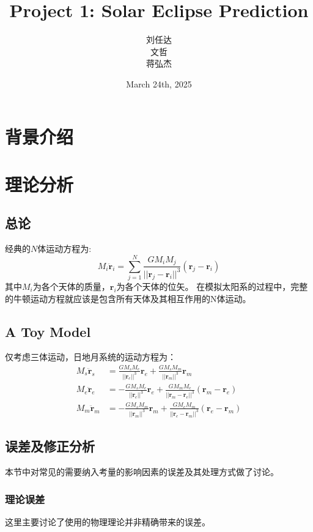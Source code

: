 \documentclass[hidelinks]{article}
\title{\textbf{Project 1: Solar Eclipse Prediction}}
\author{刘任达\\文哲\\蒋弘杰}
\date{March 24th, 2025}
\begin{document}
\hypersetup{bookmarksnumbered=true,}
\maketitle
\setcounter{tocdepth}{2}
\begin{Large}
\tableofcontents
\end{Large}%
\pagebreak

\section{背景介绍}

\section{理论分析}
\subsection{总论}
经典的$N$体运动方程为:
$$
M_i\ddot{\mathbf{r}}_i = \sum_{j=1}^N\frac{GM_iM_j}{||\mathbf{r}_j-\mathbf{r}_i||^3}(\mathbf{r}_j-\mathbf{r}_i)
$$
其中${M_i}$为各个天体的质量，$\mathbf{r}_i$为各个天体的位矢。
在模拟太阳系的过程中，完整的牛顿运动方程就应该是包含所有天体及其相互作用的N体运动。
\subsection{A Toy Model}
仅考虑三体运动，日地月系统的运动方程为：
\begin{align*}
    M_s\ddot{\mathbf{r}}_s&=\frac{GM_sM_e}{||\mathbf{r}_e||^3}\mathbf{r}_e+\frac{GM_sM_m}{||\mathbf{r}_m||^3}\mathbf{r}_m\\
    M_e\ddot{\mathbf{r}}_e&=-\frac{GM_sM_e}{||\mathbf{r}_e||^3}\mathbf{r}_e+\frac{GM_mM_e}{||\mathbf{r}_m-\mathbf{r}_e||^3}(\mathbf{r}_m-\mathbf{r}_e)\\
    M_m\ddot{\mathbf{r}}_m&=-\frac{GM_sM_m}{||\mathbf{r}_m||^3}\mathbf{r}_m+\frac{GM_eM_m}{||\mathbf{r}_e-\mathbf{r}_m||^3}(\mathbf{r}_e-\mathbf{r}_m)
\end{align*}
\subsection{误差及修正分析}
本节中对常见的需要纳入考量的影响因素的误差及其处理方式做了讨论。
\subsubsection{理论误差}
这里主要讨论了使用的物理理论并非精确带来的误差。
\end{document}
